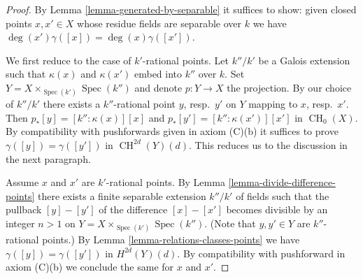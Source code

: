 \documentclass[10pt,a4paper]{amsart}
\theoremstyle{plain}
\theoremstyle{definition}
\theoremstyle{remark}
\numberwithin{equation}{subsection}
\def\Spec{\mathop{\mathrm{Spec}}}
\def\CH{\mathop{\mathrm{CH}}\nolimits}
\begin{document}
\begin{proof}
By Lemma \ref{lemma-generated-by-separable} it suffices to show: given
closed points $x, x' \in X$ whose residue fields are separable over $k$
we have $\deg(x') \gamma([x]) = \deg(x) \gamma([x'])$.

\medskip\noindent
We first reduce to the case of $k'$-rational points. Let $k''/k'$ be a
Galois extension such that $\kappa(x)$ and $\kappa(x')$ embed into $k''$
over $k$. Set $Y = X \times_{\Spec(k')} \Spec(k'')$ and denote $p : Y \to X$
the projection. By our choice of $k''/k'$ there exists a
$k''$-rational point $y$, resp.\ $y'$ on $Y$ mapping to $x$, resp.\ $x'$.
Then $p_*[y] = [k'' : \kappa(x)][x]$ and
$p_*[y'] = [k'' : \kappa(x')][x']$ in $\CH_0(X)$.
By compatibility with pushforwards given in axiom (C)(b)
it suffices to prove $\gamma([y]) = \gamma([y'])$ in $\CH^{2d}(Y)(d)$.
This reduces us to the discussion in the next paragraph.

\medskip\noindent
Assume $x$ and $x'$ are $k'$-rational points. By
Lemma \ref{lemma-divide-difference-points} there
exists a finite separable extension $k''/k'$ of fields
such that the pullback $[y] - [y']$
of the difference $[x] - [x']$ becomes divisible
by an integer $n > 1$ on $Y = X \times_{\Spec(k')} \Spec(k'')$.
(Note that $y, y' \in Y$ are $k''$-rational points.)
By Lemma \ref{lemma-relations-classes-points} we have
$\gamma([y]) = \gamma([y'])$ in $H^{2d}(Y)(d)$.
By compatibility with pushforward in axiom (C)(b)
we conclude the same for $x$ and $x'$.
\end{proof}
\end{document}
